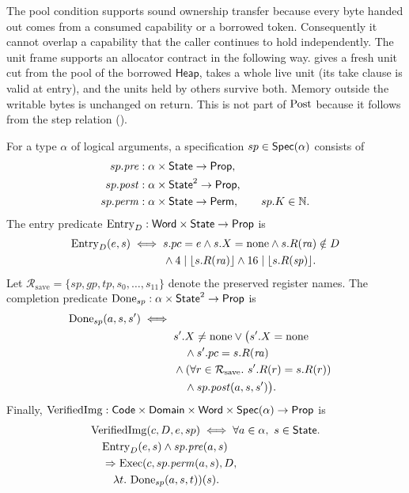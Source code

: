 The pool condition supports sound ownership transfer because every byte handed out comes from a consumed capability or a borrowed token. Consequently it cannot overlap a capability that the caller continues to hold independently. The unit frame supports an allocator contract in the following way.  gives a fresh unit cut from the pool of the borrowed $\mathsf{Heap}$,  takes a whole live unit (its take clause is valid at entry), and the units held by others survive both. Memory outside the writable bytes is unchanged on return. This is not part of $\mathrm{Post}$ because it follows from the step relation ().

\begin{definition}\label{def:vi}
For a type $\alpha$ of logical arguments, a specification $sp\in\mathsf{Spec}(\alpha)$ consists of
\[
\begin{aligned}
sp.\mathit{pre}&:\alpha\times\mathsf{State}\to\mathsf{Prop},\\
sp.\mathit{post}&:\alpha\times\mathsf{State}^2\to\mathsf{Prop},\\
sp.\mathit{perm}&:\alpha\times\mathsf{State}\to\mathsf{Perm},\qquad sp.K\in\mathbb{N}.
\end{aligned}
\]
The entry predicate $\mathrm{Entry}_D:\mathsf{Word}\times\mathsf{State}\to\mathsf{Prop}$ is
\[
\begin{aligned}
\mathrm{Entry}_D(e,s)\iff{}&s.pc=e\land s.X=\mathrm{none}\land s.R(\mathit{ra})\notin D\\
&\land4\mid\lfloor s.R(\mathit{ra})\rfloor\land16\mid\lfloor s.R(\mathit{sp})\rfloor.
\end{aligned}
\]
Let $\mathcal R_{\mathrm{save}}=\{\mathit{sp},\mathit{gp},\mathit{tp},s_0,\ldots,s_{11}\}$ denote the preserved register names. The completion predicate $\mathrm{Done}_{sp}:\alpha\times\mathsf{State}^2\to\mathsf{Prop}$ is
\[
\begin{aligned}
\mathrm{Done}_{sp}(a,s,s')\iff{}\\ &s'.X\ne\mathrm{none}\lor\big(s'.X=\mathrm{none}\\ &\quad\land s'.pc=s.R(\mathit{ra})\\
&\land(\forall r\in\mathcal R_{\mathrm{save}}.\ s'.R(r)=s.R(r))\\ &\quad\land sp.\mathit{post}(a,s,s')\big).
\end{aligned}
\]
Finally, $\mathrm{VerifiedImg}:\mathsf{Code}\times\mathsf{Domain}\times\mathsf{Word}\times\mathsf{Spec}(\alpha)\to\mathsf{Prop}$ is
\[
\begin{aligned}
&\mathrm{VerifiedImg}(c,D,e,sp)\iff\forall a\in\alpha,\ s\in\mathsf{State}.\\ &\quad\mathrm{Entry}_D(e,s)\land sp.\mathit{pre}(a,s)\\
&\quad\Rightarrow\mathrm{Exec}(c,sp.\mathit{perm}(a,s),D,\\ &\qquad\lambda t.\ \mathrm{Done}_{sp}(a,s,t))(s).
\end{aligned}
\]
\end{definition}

